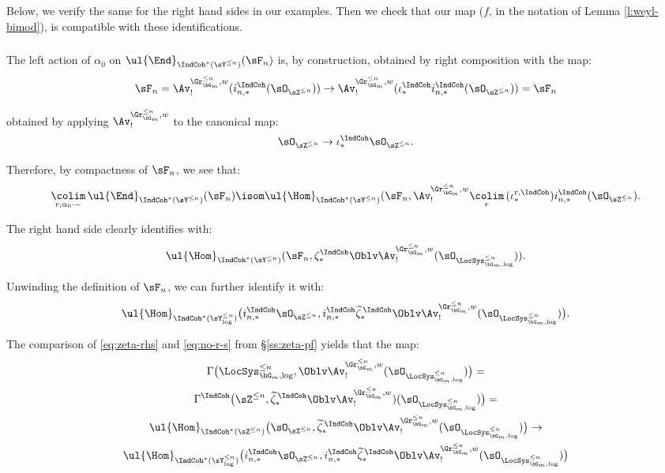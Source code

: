 Below, we verify the same for the right hand sides in our examples. Then we check that our map ($f$, in the notation of Lemma \ref{l:weyl-bimod}), is compatible
with these identifications.

\subsubsection{}\label{sss:alpha-0-left}

The left action of $\alpha_0$ on $\ul{\End}_{\IndCoh^*(\sY^{\leq n})}(\sF_n)$
is, by construction, obtained by right composition with the map:
%
\[
\sF_n =
\Av_!^{\Gr_{\bG_m}^{\leq n},w}(i_{n,*}^{\IndCoh}(\sO_{\sZ^{\leq n}})) \to
\Av_!^{\Gr_{\bG_m}^{\leq n},w}(\iota_*^{\IndCoh}i_{n,*}^{\IndCoh}(\sO_{\sZ^{\leq n}})) = \sF_n
\]

 obtained by applying $\Av_!^{\Gr_{\bG_m}^{\leq n},w}$ to
the canonical map:
%
\[
\sO_{\sZ^{\leq n}} \to \iota_*^{\IndCoh}\sO_{\sZ^{\leq n}}.
\]

Therefore, by compactness of $\sF_n$, we see that:
%
\[
\underset{r,\alpha_0\cdot-}{\colim} \, \ul{\End}_{\IndCoh^*(\sY^{\leq n})}(\sF_n)
\isom
\ul{\Hom}_{\IndCoh^*(\sY^{\leq n})}(\sF_n,
\Av_!^{\Gr_{\bG_m}^{\leq n},w} \underset{r}{\colim} \,
(\iota_*^{r,\IndCoh})i_{n,*}^{\IndCoh}(\sO_{\sZ^{\leq n}}).
\]

 The right hand side clearly identifies with:
%
\[
\ul{\Hom}_{\IndCoh^*(\sY^{\leq n})}(\sF_n,
\zeta_*^{\IndCoh}
\Oblv\Av_!^{\Gr_{\bG_m}^{\leq n},w} (\sO_{\LocSys_{\bG_m,\log}^{\leq n}})).
\]

 Unwinding the definition of $\sF_n$, we can further identify it with:
%
\[
\ul{\Hom}_{\IndCoh^*(\sY_{\log}^{\leq n})}\big(i_{n,*}^{\IndCoh}\sO_{\sZ^{\leq n}},
i_{n,*}^{\IndCoh}\widetilde{\zeta}_*^{\,\IndCoh}
\Oblv\Av_!^{\Gr_{\bG_m}^{\leq n},w} (\sO_{\LocSys_{\bG_m,\log}^{\leq n}})\big).
\]

 The comparison of \eqref{eq:zeta-rhs} and \eqref{eq:no-r-s}
from \S \ref{ss:zeta-pf} yields that the map:
%
\[
\begin{gathered}
\Gamma\big(\LocSys_{\bG_m,\log}^{\leq n},\Oblv\Av_!^{\Gr_{\bG_m}^{\leq n},w} (\sO_{\LocSys_{\bG_m,\log}^{\leq n}})\big) = \\
\Gamma^{\IndCoh}\big(\sZ^{\leq n},\widetilde{\zeta}_*^{\,\IndCoh}
\Oblv\Av_!^{\Gr_{\bG_m}^{\leq n},w})(\sO_{\LocSys_{\bG_m,\log}^{\leq n}})\big) = \\
\ul{\Hom}_{\IndCoh^*(\sZ^{\leq n})}\big(\sO_{\sZ^{\leq n}},
\widetilde{\zeta}_*^{\,\IndCoh}
\Oblv\Av_!^{\Gr_{\bG_m}^{\leq n},w} (\sO_{\LocSys_{\bG_m,\log}^{\leq n}})\big) \to \\
\ul{\Hom}_{\IndCoh^*(\sY_{\log}^{\leq n})}\big(i_{n,*}^{\IndCoh}\sO_{\sZ^{\leq n}},
i_{n,*}^{\IndCoh}\widetilde{\zeta}_*^{\,\IndCoh}
\Oblv\Av_!^{\Gr_{\bG_m}^{\leq n},w} (\sO_{\LocSys_{\bG_m,\log}^{\leq n}})\big)
\end{gathered}
\]

